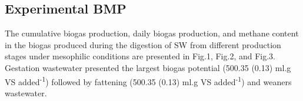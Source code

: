 \subsection{Experimental BMP}
The cumulative biogas production, daily biogas production, and methane content in the biogas produced during the digestion of SW from different production stages under mesophilic conditions are presented in Fig.1, Fig.2, and Fig.3. Gestation wastewater presented the largest biogas potential (500.35 (0.13) ml.g VS added\textsuperscript{-1}) followed by fattening (500.35 (0.13) ml.g VS added\textsuperscript{-1}) and weaners wastewater. 